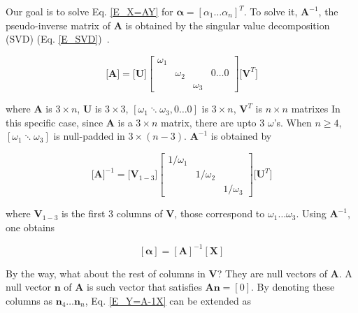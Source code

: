 \documentclass[dvipdfmx,uplatex]{article}
\begin{document}
Our goal is to solve Eq. \ref{E_X=AY} for $ \boldsymbol{\alpha} = [\alpha_1 \ldots \alpha_n]^T $. To solve it, $ \boldsymbol{A}^{-1} $, the pseudo-inverse matrix of $ \boldsymbol{A} $ is obtained by the singular value decomposition (SVD) (Eq. \ref{E_SVD})~\cite{SVD_NRC}.

\begin{equation}
  \label{E_SVD}
  \Bigg[ \boldsymbol{A} \Bigg] =
  \Bigg[ \boldsymbol{U} \Bigg]
  \left[
    \begin{array}{cccc}
      \omega_1 & \\
        & \omega_2 &   &  0 \ldots 0 \\
        &  & \omega_3 &
    \end{array}
  \right]
  \Bigg[ \boldsymbol{V}^T \Bigg]
\end{equation}

where $ \boldsymbol{A} $ is $ 3 \times n $,
$ \boldsymbol{U} $ is $ 3 \times 3 $,
$ [\omega_1 \ddots \omega_3, 0 \ldots 0] $ is $ 3 \times n $,
$ \boldsymbol{V}^T $ is $ n \times n $ matrixes
In this specific case, since $ \boldsymbol{A} $ is a $ 3 \times n $ matrix, there are upto 3 $\omega$'s. When $ n \geq 4 $, $ [\omega_1 \ddots \omega_3 ] $ is null-padded in $ 3 \times (n-3) $.
$ \boldsymbol{A}^{-1} $ is obtained by

\begin{equation}
  \Bigg[ \boldsymbol{A} \Bigg]^{-1} =
  \Bigg[ \boldsymbol{V}_{1-3} \Bigg]
  \left[
    \begin{array}{ccc}
      1/\omega_1 & & \\
      & 1/\omega_2 & \\
      & & 1/\omega_3
    \end{array}
  \right]
  \Bigg[ \boldsymbol{U}^T \Bigg]
\end{equation}

where $ \boldsymbol{V}_{1-3} $ is the first 3 columns of $ \boldsymbol{V} $, those correspond to $ \omega_1 \ldots \omega_3 $. Using $ \boldsymbol{A}^{-1} $, one obtains

\begin{equation}
  \label{E_Y=A-1X}
  \left[ \boldsymbol{\alpha} \right] =
  \left[ \boldsymbol{A} \right]^{-1}
  \left[ \boldsymbol{X} \right]
\end{equation}

By the way, what about the rest of columns in $ \boldsymbol{V} $? They are null vectors of $ \boldsymbol{A} $. A null vector $\boldsymbol{n}$ of $ \boldsymbol{A}$ is such vector that satisfies $ \boldsymbol{A} \boldsymbol{n} = [0]$. By denoting these columns as $ \boldsymbol{n}_4 \ldots \boldsymbol{n}_n $, Eq. \ref{E_Y=A-1X} can be extended as
\end{document}
